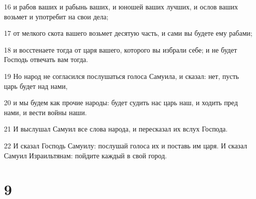 \par 16 и рабов ваших и рабынь ваших, и юношей ваших лучших, и ослов ваших возьмет и употребит на свои дела;
\par 17 от мелкого скота вашего возьмет десятую часть, и сами вы будете ему рабами;
\par 18 и восстенаете тогда от царя вашего, которого вы избрали себе; и не будет Господь отвечать вам тогда.
\par 19 Но народ не согласился послушаться голоса Самуила, и сказал: нет, пусть царь будет над нами,
\par 20 и мы будем как прочие народы: будет судить нас царь наш, и ходить пред нами, и вести войны наши.
\par 21 И выслушал Самуил все слова народа, и пересказал их вслух Господа.
\par 22 И сказал Господь Самуилу: послушай голоса их и поставь им царя. И сказал Самуил Израильтянам: пойдите каждый в свой город.

\chapter{9}

